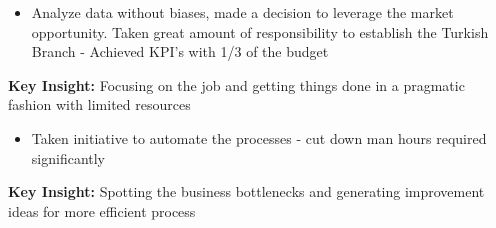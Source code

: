 \documentclass[10pt,a4paper]{altacv}
\begin{document}


\begin{itemize}

\item Analyze data without biases, made a decision to leverage the market opportunity. Taken great amount of responsibility to establish the Turkish Branch - Achieved KPI's  with 1/3 of the budget
\end{itemize}
\textbf{Key Insight:} Focusing on the job and getting things done in a pragmatic fashion with limited resources \divider
{}
\begin{itemize}
\item Taken initiative to automate the processes - cut down man hours required significantly
\end{itemize}
\textbf{Key Insight:} Spotting the business bottlenecks and generating improvement ideas for more efficient process \\
\end{document}
